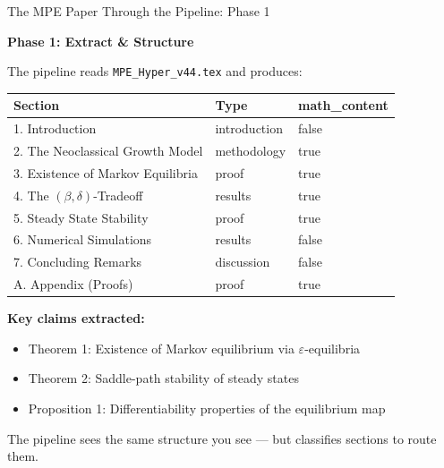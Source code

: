 \documentclass[10pt,english,aspectratio=169]{beamer}
\begin{document}
\begin{frame}{The MPE Paper Through the Pipeline: Phase 1}

\textbf{Phase 1: Extract \& Structure}

\vspace{0.2cm}
The pipeline reads \texttt{MPE\_Hyper\_v44.tex} and produces:

\vspace{0.2cm}
\begin{small}
\begin{tabular}{lll}
\toprule
\textbf{Section} & \textbf{Type} & \textbf{math\_content} \\
\midrule
1. Introduction & introduction & false \\
2. The Neoclassical Growth Model & methodology & true \\
3. Existence of Markov Equilibria & proof & true \\
4. The $(\beta,\delta)$-Tradeoff & results & true \\
5. Steady State Stability & proof & true \\
6. Numerical Simulations & results & false \\
7. Concluding Remarks & discussion & false \\
A. Appendix (Proofs) & proof & true \\
\bottomrule
\end{tabular}
\end{small}

\vspace{0.3cm}
\textbf{Key claims extracted:}
\begin{itemize}
    \item Theorem 1: Existence of Markov equilibrium via $\varepsilon$-equilibria
    \item Theorem 2: Saddle-path stability of steady states
    \item Proposition 1: Differentiability properties of the equilibrium map
\end{itemize}

The pipeline sees the same structure you see --- but classifies sections to route them.

\end{frame}
\end{document}
